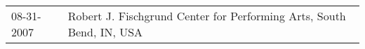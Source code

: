 \begin{supertabular}{ll}
 08-31-2007 &  Robert  J.  Fischgrund  Center for Performing Arts, South Bend, IN, USA \\
\end{supertabular}
